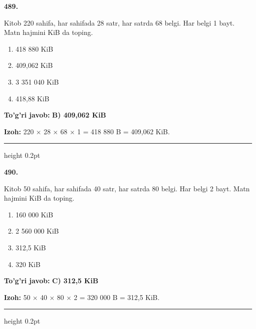 \documentclass[10pt,a4paper,oneside]{article}
\begin{document}
\noindent\textbf{\color{ink}489.}
\par
Kitob 220 sahifa, har sahifada 28 satr, har satrda 68 belgi. Har belgi 1 bayt. Matn hajmini KiB da toping.
\begin{enumerate}[label=\Alph*),leftmargin=9mm]
\item 418 880 KiB
\item 409,062 KiB
\item 3 351 040 KiB
\item 418,88 KiB
\end{enumerate}
\begin{tcolorbox}[enhanced,breakable,colback=teal!4,colframe=teal!50!black,boxrule=0.5pt,arc=1.1mm,left=3mm,right=3mm,top=1.7mm,bottom=1.7mm,before skip=2mm,after skip=2mm]
\textbf{\color{teal}To'g'ri javob:} \textbf{B) 409,062 KiB}
\par\smallskip
\textbf{Izoh:} 220 \ensuremath{\times} 28 \ensuremath{\times} 68 \ensuremath{\times} 1 = 418 880 B = 409,062 KiB.
\end{tcolorbox}
\vspace{2mm}\hrule height 0.2pt \vspace{3mm}

\noindent\textbf{\color{ink}490.}
\par
Kitob 50 sahifa, har sahifada 40 satr, har satrda 80 belgi. Har belgi 2 bayt. Matn hajmini KiB da toping.
\begin{enumerate}[label=\Alph*),leftmargin=9mm]
\item 160 000 KiB
\item 2 560 000 KiB
\item 312,5 KiB
\item 320 KiB
\end{enumerate}
\begin{tcolorbox}[enhanced,breakable,colback=teal!4,colframe=teal!50!black,boxrule=0.5pt,arc=1.1mm,left=3mm,right=3mm,top=1.7mm,bottom=1.7mm,before skip=2mm,after skip=2mm]
\textbf{\color{teal}To'g'ri javob:} \textbf{C) 312,5 KiB}
\par\smallskip
\textbf{Izoh:} 50 \ensuremath{\times} 40 \ensuremath{\times} 80 \ensuremath{\times} 2 = 320 000 B = 312,5 KiB.
\end{tcolorbox}
\vspace{2mm}\hrule height 0.2pt \vspace{3mm}
\end{document}
